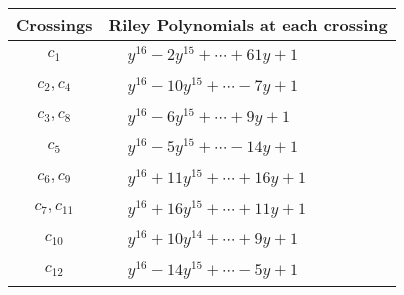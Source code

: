 \documentclass[1p]{elsarticle_modified}
\theoremstyle{definition}
\begin{document}
\begin{tabular}{m{50pt}|m{274pt}}
Crossings & \hspace{64pt}Riley Polynomials at each crossing \\
\hline $$\begin{aligned}c_{1}\end{aligned}$$&$\begin{aligned}
&y^{16}-2 y^{15}+\cdots+61 y+1
\end{aligned}$\\
\hline $$\begin{aligned}c_{2},c_{4}\end{aligned}$$&$\begin{aligned}
&y^{16}-10 y^{15}+\cdots-7 y+1
\end{aligned}$\\
\hline $$\begin{aligned}c_{3},c_{8}\end{aligned}$$&$\begin{aligned}
&y^{16}-6 y^{15}+\cdots+9 y+1
\end{aligned}$\\
\hline $$\begin{aligned}c_{5}\end{aligned}$$&$\begin{aligned}
&y^{16}-5 y^{15}+\cdots-14 y+1
\end{aligned}$\\
\hline $$\begin{aligned}c_{6},c_{9}\end{aligned}$$&$\begin{aligned}
&y^{16}+11 y^{15}+\cdots+16 y+1
\end{aligned}$\\
\hline $$\begin{aligned}c_{7},c_{11}\end{aligned}$$&$\begin{aligned}
&y^{16}+16 y^{15}+\cdots+11 y+1
\end{aligned}$\\
\hline $$\begin{aligned}c_{10}\end{aligned}$$&$\begin{aligned}
&y^{16}+10 y^{14}+\cdots+9 y+1
\end{aligned}$\\
\hline $$\begin{aligned}c_{12}\end{aligned}$$&$\begin{aligned}
&y^{16}-14 y^{15}+\cdots-5 y+1
\end{aligned}$\\
\hline
\end{tabular}\\~\\
\end{document}
